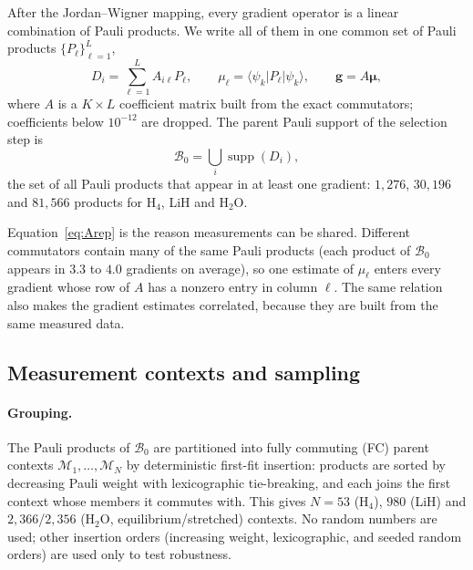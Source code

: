 \documentclass[aps,pra,reprint,superscriptaddress,nofootinbib]{revtex4-2}
\begin{document}
After the Jordan--Wigner mapping, every gradient operator is a linear combination of Pauli products. We write all of them in one common set of Pauli products $\{P_\ell\}_{\ell=1}^{L}$,
\begin{equation}
D_i=\sum_{\ell=1}^{L}A_{i\ell}P_\ell ,\qquad
\mu_\ell=\langle\psi_k\rvert P_\ell\lvert\psi_k\rangle ,\qquad
\boldsymbol g=A\boldsymbol\mu ,
\label{eq:Arep}
\end{equation}
where $A$ is a $K\times L$ coefficient matrix built from the exact commutators; coefficients below $10^{-12}$ are dropped. The parent Pauli support of the selection step is
\begin{equation}
\mathcal B_0=\bigcup_{i}\operatorname{supp}(D_i),
\end{equation}
the set of all Pauli products that appear in at least one gradient: $1{,}276$, $30{,}196$ and $81{,}566$ products for H$_4$, LiH and H$_2$O.

Equation~\eqref{eq:Arep} is the reason measurements can be shared. Different commutators contain many of the same Pauli products (each product of $\mathcal B_0$ appears in $3.3$ to $4.0$ gradients on average), so one estimate of $\mu_\ell$ enters every gradient whose row of $A$ has a nonzero entry in column $\ell$. The same relation also makes the gradient estimates correlated, because they are built from the same measured data.

\subsection{Measurement contexts and sampling}

\paragraph{Grouping.} The Pauli products of $\mathcal B_0$ are partitioned into fully commuting (FC) parent contexts $\mathcal M_1,\dots,\mathcal M_N$ by deterministic first-fit insertion: products are sorted by decreasing Pauli weight with lexicographic tie-breaking, and each joins the first context whose members it commutes with. This gives $N=53$ (H$_4$), $980$ (LiH) and $2{,}366$/$2{,}356$ (H$_2$O, equilibrium/stretched) contexts. No random numbers are used; other insertion orders (increasing weight, lexicographic, and seeded random orders) are used only to test robustness.
\end{document}
